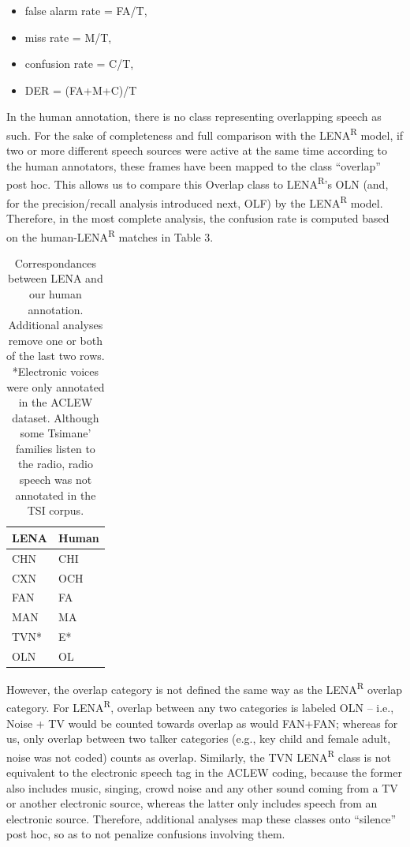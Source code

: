 \documentclass[english,table,man,floatsintext]{apa6}
\providecommand{\tightlist}{%
  \setlength{\itemsep}{0pt}\setlength{\parskip}{0pt}}
\begin{document}
\begin{itemize}
\tightlist
\item
  false alarm rate = FA/T,
\item
  miss rate = M/T,
\item
  confusion rate = C/T,
\item
  DER = (FA+M+C)/T
\end{itemize}

In the human annotation, there is no class representing overlapping speech as such. For the sake of completeness and full comparison with the LENA\textsuperscript{R} model, if two or more different speech sources were active at the same time according to the human annotators, these frames have been mapped to the class \enquote{overlap} post hoc. This allows us to compare this Overlap class to LENA\textsuperscript{R}'s OLN (and, for the precision/recall analysis introduced next, OLF) by the LENA\textsuperscript{R} model. Therefore, in the most complete analysis, the confusion rate is computed based on the human-LENA\textsuperscript{R} matches in Table 3.

\begin{table}[t]

\caption{\label{tab:tab-tsicor}Correspondances between LENA and our human annotation. Additional analyses remove one or both of the last two rows. *Electronic voices were only annotated in the ACLEW dataset. Although some Tsimane' families listen to the radio, radio speech was not annotated in the TSI corpus.}
\centering
\begin{tabular}{>{\raggedright\arraybackslash}p{2cm}>{\raggedright\arraybackslash}p{2cm}}
\toprule
LENA & Human\\
\midrule
CHN & CHI\\
CXN & OCH\\
FAN & FA\\
MAN & MA\\
TVN* & E*\\
\addlinespace
OLN & OL\\
\bottomrule
\end{tabular}
\end{table}

However, the overlap category is not defined the same way as the LENA\textsuperscript{R} overlap category. For LENA\textsuperscript{R}, overlap between any two categories is labeled OLN -- i.e., Noise + TV would be counted towards overlap as would FAN+FAN; whereas for us, only overlap between two talker categories (e.g., key child and female adult, noise was not coded) counts as overlap. Similarly, the TVN LENA\textsuperscript{R} class is not equivalent to the electronic speech tag in the ACLEW coding, because the former also includes music, singing, crowd noise and any other sound coming from a TV or another electronic source, whereas the latter only includes speech from an electronic source. Therefore, additional analyses map these classes onto \enquote{silence} post hoc, so as to not penalize confusions involving them.
\end{document}
